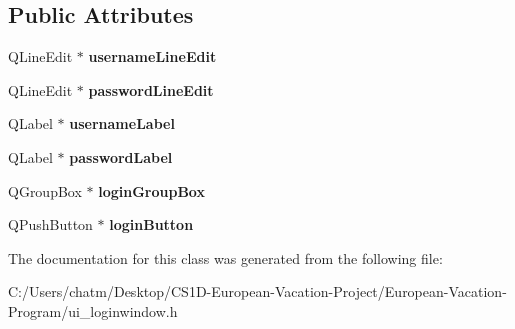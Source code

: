 \subsection*{Public Attributes}
\begin{DoxyCompactItemize}
\item 
\mbox{\label{class_ui___login_window_a5f0e5d18fc9c536647aed75348b1305f}} 
Q\+Line\+Edit $\ast$ {\bfseries username\+Line\+Edit}
\item 
\mbox{\label{class_ui___login_window_a7ca08bc4b2faa0481c83d588baba7a43}} 
Q\+Line\+Edit $\ast$ {\bfseries password\+Line\+Edit}
\item 
\mbox{\label{class_ui___login_window_a9595f2c0be7d47ee8d3de1b795d6946d}} 
Q\+Label $\ast$ {\bfseries username\+Label}
\item 
\mbox{\label{class_ui___login_window_ac7e65686283e30b9bbb24dfe6c9d7123}} 
Q\+Label $\ast$ {\bfseries password\+Label}
\item 
\mbox{\label{class_ui___login_window_a68ed6094e9a155151988d3063fda01b9}} 
Q\+Group\+Box $\ast$ {\bfseries login\+Group\+Box}
\item 
\mbox{\label{class_ui___login_window_a09edcb5fc16a3ebe02caa58c805881ce}} 
Q\+Push\+Button $\ast$ {\bfseries login\+Button}
\end{DoxyCompactItemize}


The documentation for this class was generated from the following file\+:\begin{DoxyCompactItemize}
\item 
C\+:/\+Users/chatm/\+Desktop/\+C\+S1\+D-\/\+European-\/\+Vacation-\/\+Project/\+European-\/\+Vacation-\/\+Program/ui\+\_\+loginwindow.\+h\end{DoxyCompactItemize}
